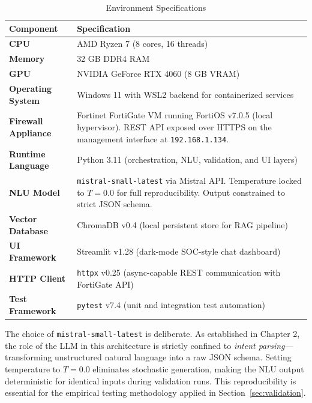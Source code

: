 \begin{table}[htpb]
\centering
\small
\begin{tabular}{|l|p{9cm}|}
\hline
\textbf{Component} & \textbf{Specification} \\ \hline
\textbf{CPU} & AMD Ryzen 7 (8 cores, 16 threads) \\ \hline
\textbf{Memory} & 32 GB DDR4 RAM \\ \hline
\textbf{GPU} & NVIDIA GeForce RTX 4060 (8 GB VRAM) \\ \hline
\textbf{Operating System} & Windows 11 with WSL2 backend for containerized services \\ \hline
\textbf{Firewall Appliance} & Fortinet FortiGate VM running FortiOS v7.0.5 (local hypervisor). REST API exposed over HTTPS on the management interface at \texttt{192.168.1.134}. \\ \hline
\textbf{Runtime Language} & Python 3.11 (orchestration, NLU, validation, and UI layers) \\ \hline
\textbf{NLU Model} & \texttt{mistral-small-latest} via Mistral API. Temperature locked to $T=0.0$ for full reproducibility. Output constrained to strict JSON schema. \\ \hline
\textbf{Vector Database} & ChromaDB v0.4 (local persistent store for RAG pipeline) \\ \hline
\textbf{UI Framework} & Streamlit v1.28 (dark-mode SOC-style chat dashboard) \\ \hline
\textbf{HTTP Client} & \texttt{httpx} v0.25 (async-capable REST communication with FortiGate API) \\ \hline
\textbf{Test Framework} & \texttt{pytest} v7.4 (unit and integration test automation) \\ \hline
\end{tabular}
\caption{Environment Specifications}
\label{tab:env_specs}
\end{table}

The choice of \texttt{mistral-small-latest} is deliberate. As established in Chapter 2, the role of the LLM in this architecture is strictly confined to \emph{intent parsing}—transforming unstructured natural language into a raw JSON schema. Setting temperature to $T=0.0$ eliminates stochastic generation, making the NLU output deterministic for identical inputs during validation runs. This reproducibility is essential for the empirical testing methodology applied in Section~\ref{sec:validation}.

